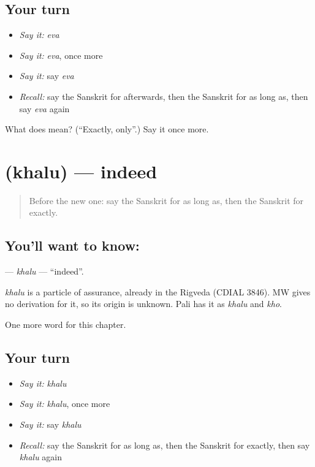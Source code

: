 \subsection*{Your turn}
\begin{itemize}
\raggedright
  \item \emph{Say it:} \emph{eva}
  \item \emph{Say it:} \emph{eva}, once more
  \item \emph{Say it:} say \emph{eva}
  \item \emph{Recall:} say the Sanskrit for afterwards, then the Sanskrit for as long as, then say \emph{eva} again
\end{itemize}

\begin{tcolorbox}[breakable,colback=teal!4,colframe=teal!35!black,title={Before you move on}]
What does  mean? (\textquotedblleft{}Exactly, only\textquotedblright{}.) Say it once more.
\end{tcolorbox}
\section[\texorpdfstring{\sk{खलु} (khalu)}{खलु (khalu)}]{ (khalu) — indeed}

\label{lesson:SA-C214-khalu}



\begin{quote}
Before the new one: say the Sanskrit for as long as, then the Sanskrit for exactly.
\end{quote}

\subsection*{You'll want to know: }
\textbf{} — \emph{khalu} — \textquotedblleft{}indeed\textquotedblright{}.

\begin{cousinweb}
\emph{khalu} is a particle of assurance, already in the Rigveda (CDIAL 3846). MW gives no derivation for it, so its origin is unknown. Pali has it as \emph{khalu} and \emph{kho}.
\end{cousinweb}

\begin{grammarlens}[title={What you've built}]
One more word for this chapter.
\end{grammarlens}

\subsection*{Your turn}
\begin{itemize}
\raggedright
  \item \emph{Say it:} \emph{khalu}
  \item \emph{Say it:} \emph{khalu}, once more
  \item \emph{Say it:} say \emph{khalu}
  \item \emph{Recall:} say the Sanskrit for as long as, then the Sanskrit for exactly, then say \emph{khalu} again
\end{itemize}

